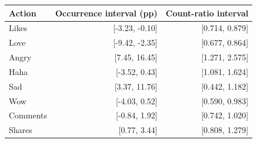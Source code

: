 \begin{tabular}{lrr}
\toprule
Action & Occurrence interval (pp) & Count-ratio interval \\
\midrule
Likes & [-3.23, -0.10] & [0.714, 0.879] \\
Love & [-9.42, -2.35] & [0.677, 0.864] \\
Angry & [7.45, 16.45] & [1.271, 2.575] \\
Haha & [-3.52, 0.43] & [1.081, 1.624] \\
Sad & [3.37, 11.76] & [0.442, 1.182] \\
Wow & [-4.03, 0.52] & [0.590, 0.983] \\
Comments & [-0.84, 1.92] & [0.742, 1.020] \\
Shares & [0.77, 3.44] & [0.808, 1.279] \\
\bottomrule
\end{tabular}

